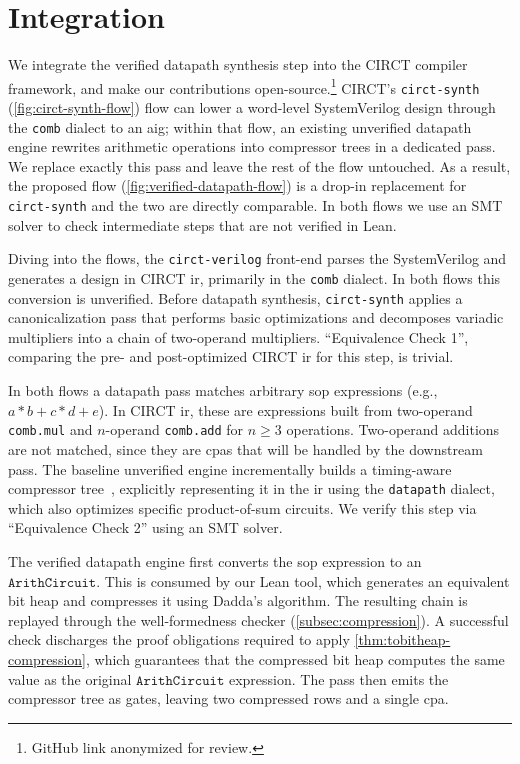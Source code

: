 \documentclass[conference]{IEEEtran}
\newcommand{\Arith}{\ensuremath{\texttt{ArithCircuit}}\xspace}
\theoremstyle{plain}
\theoremstyle{definition}
\begin{document}
\section{Integration}
\label{sec:integration}

We integrate the verified datapath synthesis step into the CIRCT compiler framework, 
and make our contributions open-source.\footnote{GitHub link anonymized for review.}
CIRCT's \texttt{circt-synth} (\autoref{fig:circt-synth-flow}) flow can lower 
a word-level SystemVerilog design through the \texttt{comb} dialect to an
\ac{aig}; within that flow, an existing unverified datapath engine rewrites arithmetic operations into
compressor trees in a dedicated pass.
We replace exactly this pass and leave the rest of the flow untouched.
As a result, the proposed flow (\autoref{fig:verified-datapath-flow}) is a drop-in 
replacement for \texttt{circt-synth} and the two are directly comparable.
In both flows we use an SMT solver to check intermediate steps that are not verified in Lean. 

Diving into the flows, the \texttt{circt-verilog} front-end parses the SystemVerilog
and generates a design in CIRCT \ac{ir}, primarily in the \texttt{comb} dialect.
In both flows this conversion is unverified.
Before datapath synthesis, \texttt{circt-synth} applies a canonicalization pass that performs basic optimizations 
and decomposes variadic multipliers into a chain of two-operand multipliers. 
``Equivalence Check 1'', comparing the pre- and post-optimized CIRCT \ac{ir} for this step, is trivial.

In both flows a datapath pass matches arbitrary \ac{sop} expressions (e.g., $a*b+c*d+e$).
In CIRCT \ac{ir}, these are expressions built from two-operand
\texttt{comb.mul} and $n$-operand \texttt{comb.add} for $n \geq 3$ operations.
Two-operand additions are not matched, since they are \acp{cpa} that will be handled
by the downstream pass.
The baseline unverified engine incrementally builds a timing-aware compressor tree~\cite{Zimmermann2009DatapathDesign}, explicitly 
representing it in the \ac{ir} using the \texttt{datapath} dialect, which also optimizes
specific product-of-sum circuits. 
We verify this step via ``Equivalence Check 2'' using an SMT solver.

The verified datapath engine first converts the \ac{sop} expression to an \Arith.
This is consumed by our Lean tool, which generates an equivalent bit heap and compresses
it using Dadda's algorithm.
The resulting chain is replayed through the well-formedness checker (\autoref{subsec:compression}). 
A successful check discharges the proof obligations required to apply \autoref{thm:tobitheap-compression}, which guarantees
that the compressed bit heap computes the same value as the original \Arith expression.
The pass then emits the compressor tree as gates, leaving two compressed rows and a single
\ac{cpa}.
\end{document}
